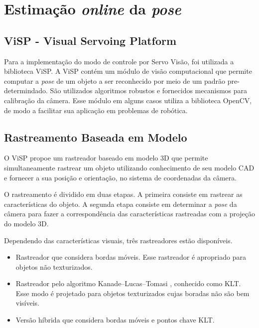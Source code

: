 \chapter{Estimação \textit{online} da \textit{pose}}  \label{chap:pose_est}
\section{ViSP - Visual Servoing Platform}

Para a implementação do modo de controle por Servo Visão, foi utilizada a biblioteca ViSP. A ViSP contém um módulo de visão computacional que permite computar a \textit{pose} de um objeto a ser reconhecido por meio de um padrão pre-determindado. São utilizados algoritmos robustos e fornecidos mecanismos para calibração da câmera. Esse módulo em alguns casos utiliza a biblioteca OpenCV, de modo a facilitar sua aplicação em problemas de robótica. 
\section{Rastreamento Baseada em Modelo}
O ViSP propoe um rastreador baseado em modelo 3D que permite simultaneamente rastrear um objeto utilizando conhecimento de seu modelo CAD e fornecer a sua posição e  orientação, no sistema de coordenadas da câmera.

O rastreamento é dividido em duas etapas. A primeira consiste em rastrear as características do objeto. A segunda etapa consiste em determinar a \textit{pose} da câmera para fazer a correspondência das características rastreadas com a projeção do modelo 3D.

Dependendo das características visuais, três rastreadores estão disponíveis.
\begin{itemize}
\item Rastreador que considera bordas móveis. Esse rastreador é apropriado para objetos não texturizados.
\item Rastreador pelo algoritmo Kanade–Lucas–Tomasi \citep{tomasi1991detection}, conhecido como KLT. Esse modo é projetado para objetos texturizados cujas boradas não são bem visíveis.
\item Versão híbrida que considera bordas móveis e pontos chave KLT. 
\end{itemize}

